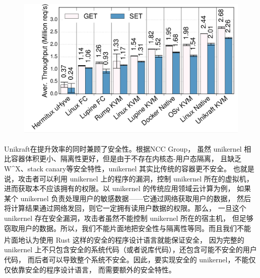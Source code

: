 \documentclass[UTF8,fontset=none,linespread=1.15]{ctexart}
\let\nosupcite\cite
\renewcommand*{\cite}[1]{\textsuperscript{\nosupcite{#1}}}
\begin{document}
\begin{figure}[H]
\begin{minipage}{0.32\linewidth}
\caption{}
\end{minipage}
\begin{minipage}{0.32\linewidth}
\includegraphics[width=1\linewidth]{pictures/Unikraft-throughput.png}
\caption{}
\end{minipage}
\end{figure}

Unikraft在提升效率的同时兼顾了安全性。根据NCC Group\cite{bib:unikernel-secuirty}，
虽然 unikernel 相比容器体积更小、隔离性更好，但是由于不存在内核态-用户态隔离，
且缺乏W\^{}X、stack canary等安全特性，unikernel 其实比传统的容器更不安全。
也就是说，攻击者可以利用 unikernel 上的程序的漏洞，控制 unikernel 所在的虚拟机，
进而获取本不应该拥有的权限。以 unikernel 的传统应用领域云计算为例，
如果某个 unikernel 负责处理用户的敏感数据——它通过网络获取用户的数据，
然后将计算结果通过网络发回，则它一定拥有读用户数据的权限。那么，
一旦这个 unikernel 存在安全漏洞，攻击者虽然不能控制 unikernel 所在的宿主机，
但足够窃取用户的数据。所以，我们不能片面地把安全性与隔离性等同。而且我们不能
片面地认为使用 Rust 这样的安全的程序设计语言就能保证安全\cite{bib:unikraft-secuirty}，
因为完整的 unikernel 上不只包含安全的系统代码（或者说库代码），还包含可能不安全的用户代码，
而后者可以导致整个系统不安全。因此，要实现安全的 unikernel，不能仅仅依靠安全的程序设计语言，
而需要额外的安全特性。
\end{document}
